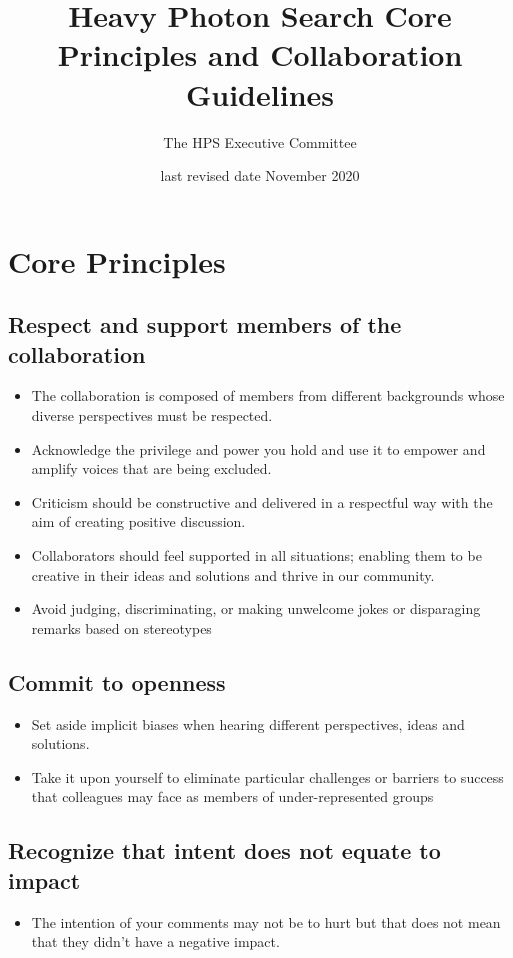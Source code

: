 \documentclass[10pt]{article}
\title{Heavy Photon Search Core Principles and Collaboration Guidelines}
\author{The HPS Executive Committee}
\date{last revised date November 2020}
\begin{document}
\maketitle

\normalsize
\tableofcontents
\clearpage

\section{Core Principles}

\subsection{Respect and support members of the collaboration}
\begin{itemize}
    \item The collaboration is composed of members from different backgrounds whose
    diverse perspectives must be respected. 
    \item Acknowledge the privilege and power you hold and use it to empower 
    and amplify voices that are being excluded. 
    \item Criticism should be constructive and delivered in a respectful way
    with the aim of creating positive discussion. 
    \item Collaborators should feel supported in all situations; enabling 
    them to be creative in their ideas and solutions and thrive in our 
    community. 
    \item Avoid judging, discriminating, or making unwelcome jokes or disparaging remarks based on stereotypes
\end{itemize}

\subsection{Commit to openness}
\begin{itemize}
    \item Set aside implicit biases when hearing different perspectives, ideas and solutions.   
    \item Take it upon yourself to eliminate particular challenges or barriers to success that colleagues may face as members of under-represented groups
\end{itemize}

\subsection{Recognize that intent does not equate to impact}
\begin{itemize}
    \item The intention of your comments may not be to hurt but that does not
    mean that they didn't have a negative impact. 
\end{itemize}
\end{document}
